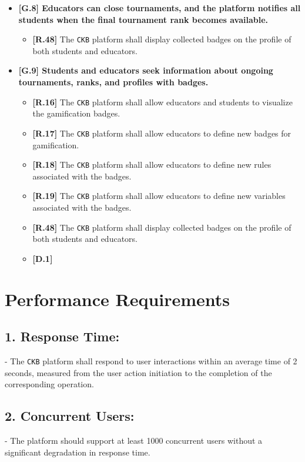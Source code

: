 \begin{itemize}
        \item \textbf{{[G.8]} Educators can close tournaments, and the platform notifies all students when the final tournament rank becomes available. }
        \begin{itemize}
            \item \textbf{[R.48]} The \verb|CKB| platform shall display collected badges on the profile of both students and educators.   
        \end{itemize}

        \item \textbf{{[G.9]} Students and educators seek information about ongoing tournaments, ranks, and profiles with badges.}
        \begin{itemize}
            \item \textbf{[R.16]} The \verb|CKB| platform shall allow educators and students to visualize the gamification badges.
            \item \textbf{[R.17]} The \verb|CKB| platform shall allow educators to define new badges for gamification.
            \item \textbf{[R.18]} The \verb|CKB| platform shall allow educators to define new rules associated with the badges.
            \item \textbf{[R.19]} The \verb|CKB| platform shall allow educators to define new variables associated with the badges.
            \item \textbf{[R.48]} The \verb|CKB| platform shall display collected badges on the profile of both students and educators.   
            \item \textbf{[D.1]}
        \end{itemize}
\end{itemize}


\section{Performance Requirements}
\label{subsec:performance_requirements}%

\subsection*{1. Response Time:}
   - The \verb|CKB| platform shall respond to user interactions within an average time of 2 seconds, measured from the user action initiation to the completion of the corresponding operation.

\subsection*{2. Concurrent Users:}
   - The platform should support at least 1000 concurrent users without a significant degradation in response time.

